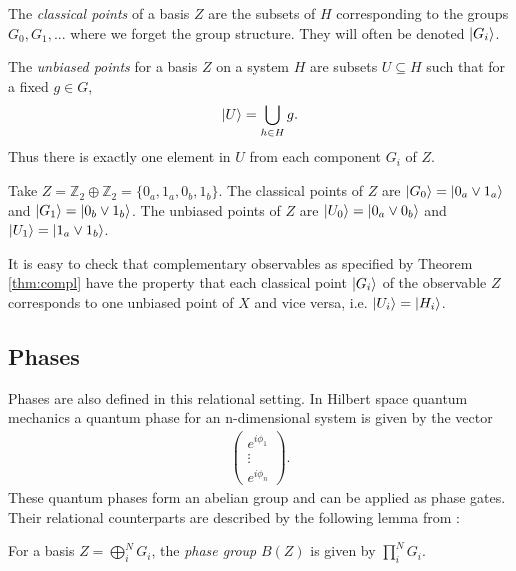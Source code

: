 \begin{corollary}
The \emph{classical points} of a basis $Z$ are the subsets of $H$ corresponding to the groups $G_0, G_1,...$ where we forget the group structure. They will often be denoted $| G_i \rangle$.
\end{corollary}

\begin{corollary}
The \emph{unbiased points} for a basis $Z$ on a system $H$ are subsets $U\subseteq H$ such that for a fixed $g\in G$,
\begin{align*}
| U \rangle = \bigcup_{h\in H}g .
\end{align*}
Thus there is exactly one element in $U$ from each component $G_i$ of $Z$.
\end{corollary}

\begin{example}
Take $Z = \mathbb{Z}_2\oplus\mathbb{Z}_2=\{0_a,1_a,0_b,1_b\}$. The classical points of $Z$ are $| G_0 \rangle=| 0_a\vee1_a \rangle$ and $| G_1 \rangle=| 0_b\vee1_b \rangle$.  The unbiased points of $Z$ are $| U_0 \rangle=| 0_a\vee0_b \rangle$ and $| U_1 \rangle=| 1_a\vee1_b \rangle$.
\end{example}

It is easy to check that complementary observables as specified by Theorem \ref{thm:compl} have the property that each classical point $| G_i \rangle$ of the observable $Z$ corresponds to one unbiased point of $X$ and vice versa, i.e. $| U_i \rangle=| H_i \rangle$.

\subsection{Phases}

Phases are also defined in this relational setting.  In Hilbert space quantum mechanics a quantum phase for an n-dimensional system is given by the vector
\begin{align*}
\left(\begin{array}{c}
e^{i\phi_1} \\
\vdots \\
e^{i\phi_n}
\end{array}
\right).
\end{align*}
These quantum phases form an abelian group and can be applied as phase gates.
Their relational counterparts are described by the following lemma from \cite{cqm-notes}:
\begin{lemma}
For a basis $Z=\bigoplus_i^NG_i$, the \emph{phase group} $B(Z)$ is given by $\prod_i^NG_i$.
\end{lemma}


